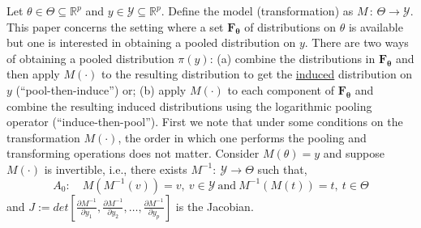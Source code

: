 \documentclass[11pt]{article}
\begin{document}
Let $\theta \in \Theta \subseteq \mathbb{R}^p$ and $y \in \mathcal{Y} \subseteq \mathbb{R}^p$. 
Define the model (transformation) as $M \,:\, \Theta \to \mathcal{Y}$. 
This paper concerns the setting where a set $\mathbf{F_\theta}$ of distributions on $\theta$ is available but one is interested in obtaining a pooled distribution on $y$.
There are two ways of obtaining a pooled distribution $\pi(y)$: (a) combine the distributions in $\mathbf{F_\theta}$ and then apply $M(\cdot)$ to the resulting distribution to get the \underline{induced} distribution on $y$ (``pool-then-induce'') or; (b) apply  $M(\cdot)$ to each component of $\mathbf{F_\theta}$ and combine the resulting induced distributions using the logarithmic pooling operator (``induce-then-pool''). 
First we note that under some conditions on the transformation $M(\cdot)$, the order in which one performs the pooling and transforming operations does not matter.
Consider $M(\theta) = y$ and suppose $M(\cdot)$ is invertible, i.e., there exists $M^{-1}: \: \mathcal{Y} \to \Theta$ such that,
\[A_0:\quad M(M^{-1}(v)) = v,\: v \in \mathcal{Y}\: \text{and}\: M^{-1}(M(t)) = t, \: t \in \Theta \]
and $J := det \left[ \frac{\partial M^{-1}}{\partial y_1}, \frac{\partial M^{-1}}{\partial y_2}, \ldots, \frac{\partial M^{-1}}{\partial y_p}\right]$ is the Jacobian.
\end{document}
